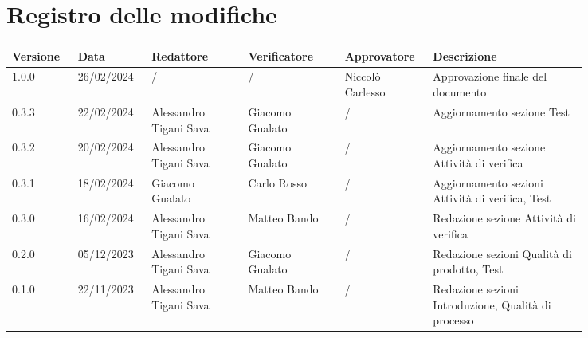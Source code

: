 \section*{Registro delle modifiche}
{
\renewcommand{\arraystretch}{1.5}
\scriptsize
\begin{longtable}{p{0.10\linewidth}p{0.10\linewidth}p{0.15\linewidth}p{0.15\linewidth}p{0.10\linewidth}p{0.24\linewidth}}
	\textbf{Versione} & \textbf{Data} & \textbf{Redattore}	& \textbf{Verificatore} & \textbf{Approvatore} & \textbf{Descrizione}	\\
	\toprule
	1.0.0	& 26/02/2024	& /					& /			& Niccolò Carlesso	& Approvazione finale del documento	\\
	\hline
	0.3.3	& 22/02/2024	& Alessandro Tigani Sava	& Giacomo Gualato	& /	& Aggiornamento sezione Test	\\
	\hline
	0.3.2	& 20/02/2024	& Alessandro Tigani Sava	& Giacomo Gualato	& /	& Aggiornamento sezione Attività di verifica	\\
	\hline
	0.3.1	& 18/02/2024	& Giacomo Gualato			& Carlo Rosso		& /	& Aggiornamento sezioni Attività di verifica, Test	\\
	\hline
	0.3.0	& 16/02/2024	& Alessandro Tigani Sava	& Matteo Bando		& /	& Redazione sezione Attività di verifica	\\
	\hline
	0.2.0 	& 05/12/2023	& Alessandro Tigani Sava 	& Giacomo Gualato	& /	& Redazione sezioni Qualità di prodotto, Test \\
	\hline
	0.1.0	& 22/11/2023    & Alessandro Tigani Sava	& Matteo Bando		& /	& Redazione sezioni Introduzione, Qualità di processo	\\
	\bottomrule
\end{longtable}
}